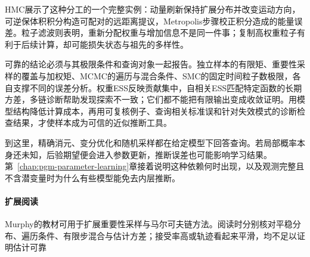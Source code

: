 HMC展示了这种分工的一个完整实例：动量刷新保持扩展分布并改变运动方向，可逆保体积积分构造可配对的远距离提议，Metropolis步骤校正积分造成的能量误差。粒子滤波则表明，重新分配权重与增加信息不是同一件事；复制高权重粒子有利于后续计算，却可能损失状态与祖先的多样性。

可靠的结论必须与其极限条件和查询对象一起报告。独立样本的有限矩、重要性采样的覆盖与加权矩、MCMC的遍历与混合条件、SMC的固定时间粒子数极限，各自支撑不同的误差分析。权重ESS反映贡献集中，自相关ESS匹配特定函数的长期方差，多链诊断帮助发现探索不一致；它们都不能把有限输出变成收敛证明。用模型结构降低计算成本，再用可复核例子、查询相关标准误和针对失效模式的诊断检查结果，才使样本成为可信的近似推断工具。

到这里，精确消元、变分优化和随机采样都在给定模型下回答查询。若局部概率本身还未知，后验期望便会进入参数更新，推断误差也可能影响学习结果。第~\ref{chap:pgm-parameter-learning}章接着说明这种依赖何时出现，以及观测完整且不含潜变量时为什么有些模型能免去内层推断。

\paragraph{扩展阅读}
Murphy的教材可用于扩展重要性采样与马尔可夫链方法。阅读时分别核对平稳分布、遍历条件、有限步混合与估计方差；接受率高或轨迹看起来平滑，均不足以证明估计可靠

